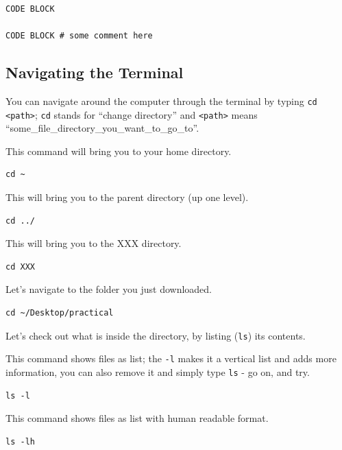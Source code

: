 \documentclass[
]{book}
\newcommand{\passthrough}[1]{#1}
\begin{document}
\begin{lstlisting}
CODE BLOCK

CODE BLOCK # some comment here
\end{lstlisting}

\hypertarget{navigating-the-terminal}{%
\subsection{Navigating the Terminal}\label{navigating-the-terminal}}

You can navigate around the computer through the terminal by typing \passthrough{\lstinline!cd <path>!}; \passthrough{\lstinline!cd!} stands for ``change directory'' and \passthrough{\lstinline!<path>!} means ``some\_file\_directory\_you\_want\_to\_go\_to''.

This command will bring you to your home directory.

\begin{lstlisting}
cd ~ 
\end{lstlisting}

This will bring you to the parent directory (up one level).

\begin{lstlisting}
cd ../ 
\end{lstlisting}

This will bring you to the XXX directory.

\begin{lstlisting}
cd XXX 
\end{lstlisting}

Let's navigate to the folder you just downloaded.

\begin{lstlisting}
cd ~/Desktop/practical
\end{lstlisting}

Let's check out what is inside the directory, by listing (\passthrough{\lstinline!ls!}) its contents.

This command shows files as list; the \passthrough{\lstinline!-l!} makes it a vertical list and adds more information, you can also remove it and simply type \passthrough{\lstinline!ls!} - go on, and try.

\begin{lstlisting}
ls -l 
\end{lstlisting}

This command shows files as list with human readable format.

\begin{lstlisting}
ls -lh 
\end{lstlisting}
\end{document}
